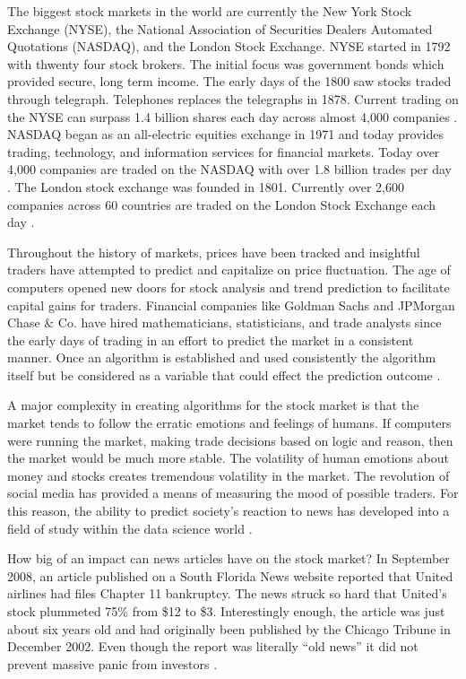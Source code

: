 \documentclass[sigconf]{acmart}
\begin{document}
The biggest stock markets in the world are currently the New York Stock Exchange (NYSE), the National Association of Securities Dealers Automated Quotations (NASDAQ), and the London Stock Exchange. NYSE started in 1792 with thwenty four stock brokers. The initial focus was government bonds which provided secure, long term income. The early days of the 1800 saw stocks traded through telegraph. Telephones replaces the telegraphs in 1878. Current trading on the NYSE can surpass 1.4 billion shares each day across almost 4,000 companies \cite{www-nyse}. NASDAQ began as an all-electric equities exchange in 1971 and today provides trading, technology, and information services for financial markets. Today over 4,000 companies are traded on the NASDAQ with over 1.8 billion trades per day \cite{www-nasdaq}. The London stock exchange was founded in 1801. Currently over 2,600 companies across 60 countries are traded on the London Stock Exchange each day \cite{www-lse}.

Throughout the history of markets, prices have been tracked and insightful traders have attempted to predict and capitalize on price fluctuation. The age of computers opened new doors for stock analysis and trend prediction to facilitate capital gains for traders. Financial companies like Goldman Sachs and JPMorgan Chase \& Co. have hired mathematicians, statisticians, and trade analysts since the early days of trading in an effort to predict the market in a consistent manner. Once an algorithm is established and used consistently the algorithm itself but be considered as a variable that could effect the prediction outcome \cite{Helverbatimrom}. 

A major complexity in creating algorithms for the stock market is that the market tends to follow the erratic emotions and feelings of humans. If computers were running the market, making trade decisions based on logic and reason, then the market would be much more stable. The volatility of human emotions about money and stocks creates tremendous volatility in the market. The revolution of social media has provided a means of measuring the mood of possible traders. For this reason, the ability to predict society's reaction to news has developed into a field of study within the data science world \cite{BOLLEN}. 

How big of an impact can news articles have on the stock market? In September 2008, an article published on a South Florida News website reported that United airlines had files Chapter 11 bankruptcy. The news struck so hard that United's stock plummeted 75\% from \$12 to \$3. Interestingly enough, the article was just about six years old and had originally been published by the Chicago Tribune in December 2002. Even though the report was literally ``old news'' it did not prevent massive panic from investors \cite{www-chTrib}.
\end{document}
